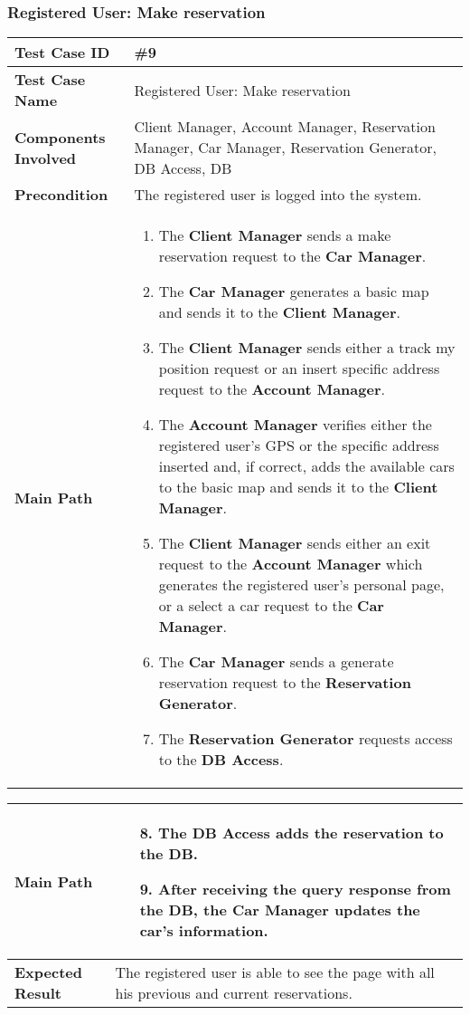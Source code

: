 \subsubsection{Registered User: Make reservation}
\begin{center}
	\begin{tabular} { | m{4.5cm} | m{8.5cm} | }
		\hline
		\textbf{Test Case ID} & \#9\\
		\hline
		\textbf{Test Case Name} & Registered User: Make reservation\\
		\hline
		\textbf{Components Involved} & Client Manager, Account Manager, Reservation Manager, Car Manager, Reservation Generator, DB Access, DB\\
		\hline
		\textbf{Precondition} & The registered user is logged into the system.\\
		\hline 
		\textbf{Main Path} & 
		\begin{enumerate}
			\item The \textbf{Client Manager} sends a make reservation request to the \textbf{Car Manager}.
			\item The \textbf{Car Manager} generates a basic map and sends it to the \textbf{Client Manager}.
			\item The \textbf{Client Manager} sends either a track my position request or an insert specific address request to the \textbf{Account Manager}.
			\item The \textbf{Account Manager} verifies either the registered user's GPS or the specific address inserted and, if correct, adds the available cars to the basic map and sends it to the \textbf{Client Manager}.
			\item The \textbf{Client Manager} sends either an exit request to the \textbf{Account Manager} which generates the registered user's personal page, or a select a car request to the \textbf{Car Manager}.
			\item The \textbf{Car Manager} sends a generate reservation request to the \textbf{Reservation Generator}.
			\item The \textbf{Reservation Generator} requests access to the \textbf{DB Access}.
		\end{enumerate}\\
	\end{tabular}
\end{center}

\begin{center}
	\begin{tabular} { | m{4.5cm} | m{8.5cm} | }
			\textbf{Main Path} & 
			\begin{enumerate}
				\item [8.] The \textbf{DB Access} adds the reservation to the \textbf{DB}.
			\item [9.]After receiving the query response from the \textbf{DB}, the \textbf{Car Manager} updates the car's information.
		\end{enumerate}\\
		\hline
		\textbf{Expected Result} & The registered user is able to see the page with all his previous and current reservations.\\
		\hline
	\end{tabular}
\end{center}